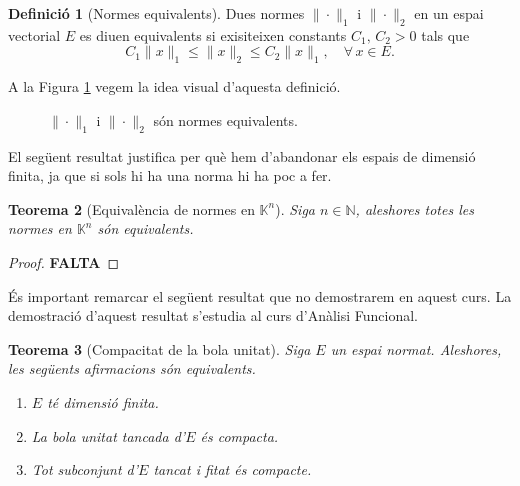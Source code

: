 \documentclass[12pt]{book}
\newtheorem{teorema}{Teorema}[chapter]
\theoremstyle{definition}
\newtheorem{defi}[teorema]{Definició}
\theoremstyle{nota}
\theoremstyle{exemple}
\begin{document}
\begin{defi}[Normes equivalents]
  Dues normes $\|\cdot\|_1$ i $\|\cdot\|_2$ en un espai vectorial $E$
  es diuen equivalents si exisiteixen constants $C_1,\, C_2 > 0$ tals
  que
  \[
    C_1 \|x\|_1 \leq \|x\|_2 \leq C_2 \|x\|_1, \quad \forall\, x \in E.
  \]
\end{defi}

A la Figura \ref{fig:normes-equiv} vegem la idea visual d'aquesta
definició.

\begin{figure}[htbp]
  \centering
  \caption{$\|\cdot\|_1$ i $\|\cdot\|_2$ són normes equivalents.}
  \label{fig:normes-equiv}
\end{figure}

El següent resultat justifica per què hem d'abandonar els espais de
dimensió finita, ja que si sols hi ha una norma hi ha poc a fer.

\begin{teorema}[Equivalència de normes en $\mathbb{K}^n$]
  Siga $n \in \mathbb{N}$, aleshores totes les normes en
  $\mathbb{K}^n$ són equivalents.
\end{teorema}

\begin{proof}
  \color{red}\sffamily\bfseries
  FALTA 
\end{proof}

És important remarcar el següent resultat que no demostrarem en aquest
curs. La demostració d'aquest resultat s'estudia al curs d'Anàlisi
Funcional.

\begin{teorema}[Compacitat de la bola unitat]
  Siga $E$ un espai normat. Aleshores, les següents afirmacions són
  equivalents.
  \begin{enumerate}[nosep]
  \item $E$ té dimensió finita.
  \item La bola unitat tancada d'$E$ és compacta.
  \item Tot subconjunt d'$E$ tancat i fitat és compacte.
  \end{enumerate}
\end{teorema}
\end{document}
